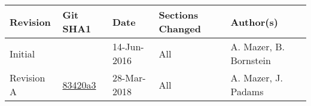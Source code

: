 %
%

\section*{}

\renewcommand{\arraystretch}{1.5}
\begin{table}[htp]
    \begin{center}
        \begin{tabular}{|p{2cm}|p{2cm}|p{2.5cm}|p{4cm}|p{4cm}|}
            \hline
            \textbf{Revision} & \textbf{Git SHA1} & \textbf{Date} & \textbf{Sections Changed} & \textbf{Author(s)} \\
            \hline\hline
            Initial &  & 14-Jun-2016 & All & A. Mazer, B. Bornstein \\
            \hline
            Revision A & \href{https://github.jpl.nasa.gov/oco3/oco3mos/tree/0.25.0/config/tlm/fsw3}{83420a3} & 28-Mar-2018 & All & A. Mazer, J. Padams \\
            \hline
        \end{tabular}
    \end{center}
\end{table}
